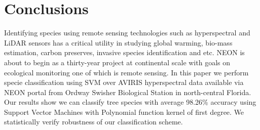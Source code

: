 \documentclass[remotesensing,article,accept,moreauthors,pdftex,12pt,a4paper]{mdpi}
\begin{document}




\section{Conclusions}

Identifying species using remote sensing technologies such as hyperspectral and LiDAR sensors has a critical utility in studying global warming, bio-mass estimation, carbon preserves, invasive species identification and etc. NEON is about to begin as a thirty-year project at continental scale with goals on ecological monitoring one of which is remote sensing. In this paper we perform specie classification using SVM over AVIRIS hyperspectral data available via NEON portal from Ordway Swisher Biological Station in north-central Florida. Our results show we can classify tree species with average 98.26\% accuracy using Support Vector Machines with Polynomial function kernel of first degree. We statistically verify robustness of our classification scheme.











\end{document}
